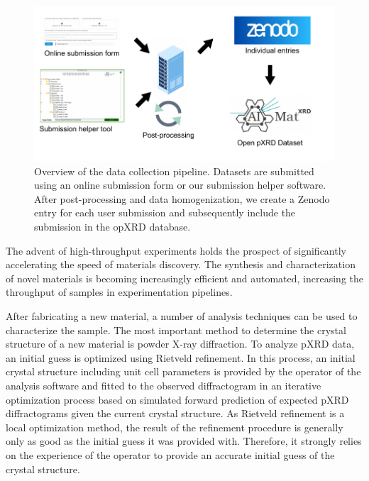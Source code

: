 

\begin{figure}[!ht]
    \centering
    \includegraphics{figures/overview.pdf}
    \caption{Overview of the data collection pipeline. Datasets are submitted using an online submission form or our submission helper software. After post-processing and data homogenization, we create a Zenodo entry for each user submission and subsequently include the submission in the opXRD database.}
    \label{fig:overview}
\end{figure}

The advent of high-throughput experiments holds the prospect of significantly accelerating the speed of materials discovery. \cite{Liu2019}
The synthesis and characterization of novel materials is becoming increasingly efficient and automated,
increasing the throughput of samples in experimentation pipelines. \cite{MacLeod2019, Ludwig2019, Ozaki2020}

After fabricating a new material, a number of analysis techniques can be used to characterize the sample.
The most important method to determine the crystal structure of a new material is powder X-ray diffraction. 
To analyze pXRD data, an initial guess is optimized using Rietveld refinement. In this process, an initial crystal structure including unit cell parameters is provided by the operator of the analysis software and fitted to the observed diffractogram in an iterative optimization process based on simulated forward prediction of expected pXRD diffractograms given the current crystal structure.\cite{Dinnebier2019, Cano2021}
As Rietveld refinement is a local optimization method, the result of the refinement procedure is generally only as good as the initial guess it was provided with.
Therefore, it strongly relies on the experience of the operator to provide an accurate initial guess of the crystal structure.

